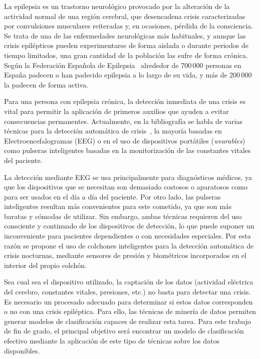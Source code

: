 
La epilepsia es un trastorno neurológico provocado por la alteración de la actividad normal de una región cerebral, que desencadena crisis caracterizadas por convulsiones musculares reiteradas y, en ocasiones, pérdida de la consciencia. Se trata de una de las enfermedades neurológicas más habituales, y aunque las crisis epilépticos pueden experimentarse de forma aislada o durante periodos de tiempo limitados, una gran cantidad de la población las sufre de forma crónica. Según la Federación Española de Epilepsia~\cite{fed_esp_epilepsia} alrededor de 700\,000 personas en España padecen o han padecido epilepsia a lo largo de su vida, y más de 200\,000 la padecen de forma activa. 

Para una persona con epilepsia crónica, la detección inmediata de una crisis es vital para permitir la aplicación de primeros auxilios que ayuden a evitar consecuencias permanentes. Actualmente, en la bibliografía se habla de varias técnicas para la detección automática de crisis~\cite{ramgopal2014epilepsy,tzallas2012automated}, la mayoría basadas en Electroencefalogramas (EEG) o en el uso de dispositivos portátiles (\textit{wearables}) como pulseras inteligentes basadas en la monitorización de las constantes vitales del paciente. 

La detección mediante EEG se usa principalmente para diagnósticos médicos, ya que los dispositivos que se necesitan son demasiado costosos o aparatosos como para ser usados en el día a día del paciente. Por otro lado, las pulseras inteligentes resultan más convenientes para este cometido, ya que son más baratas y cómodas de utilizar. Sin embargo, ambas técnicas requieren del uso consciente y continuado de los dispositivos de detección, lo que puede suponer un inconveniente para pacientes dependientes o con necesidades especiales. Por esta razón se propone el uso de colchones inteligentes para la detección automática de crisis nocturnas, mediante sensores de presión y biométricos incorporados en el interior del propio colchón. 

Sea cual sea el dispositivo utilizado, la captación de los datos (actividad eléctrica del cerebro, constantes vitales, presiones, etc.) no basta para detectar una crisis. Es necesario un procesado adecuado para determinar si estos datos corresponden o no con una crisis epiléptica. Para ello, las técnicas de minería de datos permiten generar modelos de clasificación capaces de realizar esta tarea. Para este trabajo de fin de grado, el principal objetivo será encontrar un modelo de clasificación efectivo mediante la aplicación de este tipo de técnicas sobre los datos disponibles.

